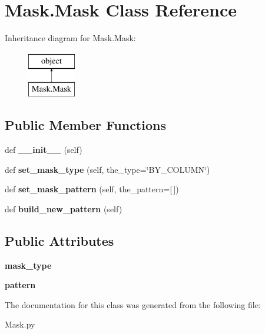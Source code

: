 \hypertarget{class_mask_1_1_mask}{}\section{Mask.\+Mask Class Reference}
\label{class_mask_1_1_mask}
Inheritance diagram for Mask.\+Mask\+:\begin{figure}[H]
\begin{center}
\leavevmode
\includegraphics[height=2.000000cm]{class_mask_1_1_mask}
\end{center}
\end{figure}
\subsection*{Public Member Functions}
\begin{DoxyCompactItemize}
\item 
\mbox{\label{class_mask_1_1_mask_aaa527b7445637b4403881b25d01416e3}} 
def {\bfseries \+\_\+\+\_\+init\+\_\+\+\_\+} (self)
\item 
\mbox{\label{class_mask_1_1_mask_a101382d597701434e46b2f0bed31627a}} 
def {\bfseries set\+\_\+mask\+\_\+type} (self, the\+\_\+type=\char`\"{}B\+Y\+\_\+\+C\+O\+L\+U\+MN\char`\"{})
\item 
\mbox{\label{class_mask_1_1_mask_a15692b640bf675e85048c9baef49a21e}} 
def {\bfseries set\+\_\+mask\+\_\+pattern} (self, the\+\_\+pattern=\mbox{[}$\,$\mbox{]})
\item 
\mbox{\label{class_mask_1_1_mask_a011e0baf03fb07fbc29603445582a465}} 
def {\bfseries build\+\_\+new\+\_\+pattern} (self)
\end{DoxyCompactItemize}
\subsection*{Public Attributes}
\begin{DoxyCompactItemize}
\item 
\mbox{\label{class_mask_1_1_mask_afe50418ab75c0bfbea7920db19d2a3d0}} 
{\bfseries mask\+\_\+type}
\item 
\mbox{\label{class_mask_1_1_mask_ac68c047585042b1149db6f220990a4ad}} 
{\bfseries pattern}
\end{DoxyCompactItemize}


The documentation for this class was generated from the following file\+:\begin{DoxyCompactItemize}
\item 
Mask.\+py\end{DoxyCompactItemize}
